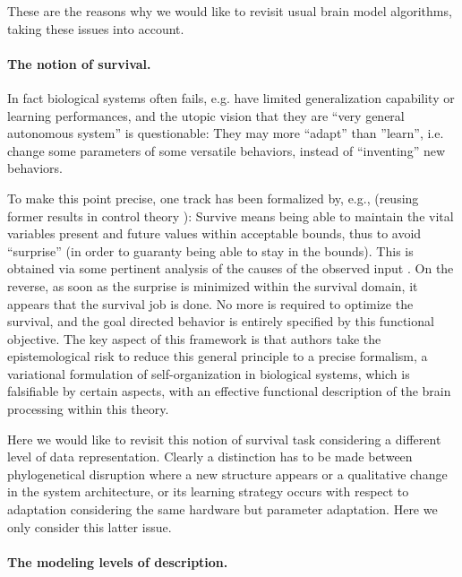 \documentclass[a4,12pt,twoside]{article}
\begin{document}
These are the reasons why we would like to revisit usual brain model algorithms, taking these issues into account.

\paragraph{The notion of survival.}

In fact biological systems often fails, e.g. have limited generalization capability or learning performances, and the utopic vision that they are ``very general autonomous system'' is questionable: They may more ``adapt'' than ''learn'', i.e. change some parameters of some versatile behaviors, instead of ``inventing'' new behaviors.

To make this point precise, one track has been formalized by, e.g., \cite{friston2016active2} (reusing former results in control theory \cite{haddad1981monotone}): Survive means being able to maintain the vital variables present and future values within acceptable bounds, thus to avoid ``surprise'' (in order to guaranty being able to stay in the bounds). This is obtained via some pertinent analysis of the causes of the observed input \cite{schwartenbeck2013exploration}. On the reverse, as soon as the surprise is minimized within the survival domain, it appears that the survival job is done. No more is required to optimize the survival, and the goal directed behavior is entirely specified by this functional objective. The key aspect of this framework is that authors take the epistemological risk to reduce this general principle to a precise formalism, a variational formulation of self-organization in biological systems, which is falsifiable \cite{popper2005logic} by certain aspects, with an effective functional description of the brain processing within this theory.

Here we would like to revisit this notion of survival task considering a different level of data representation. Clearly a distinction has to be made between phylogenetical disruption where a new structure appears or a qualitative change in the system architecture, or its learning strategy occurs with respect to adaptation considering the same hardware but parameter adaptation. Here we only consider this latter issue.

\paragraph{The modeling levels of description.}
\end{document}

